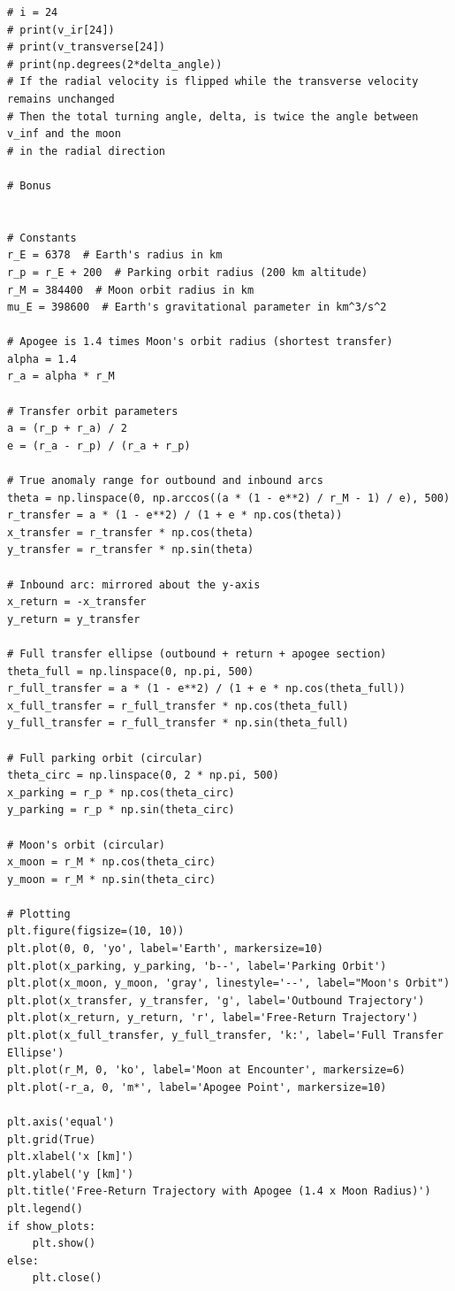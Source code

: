 \documentclass[12pt,twocolumn]{article}  %
\begin{document}
\begin{verbatim}
# i = 24
# print(v_ir[24])
# print(v_transverse[24])
# print(np.degrees(2*delta_angle))
# If the radial velocity is flipped while the transverse velocity remains unchanged
# Then the total turning angle, delta, is twice the angle between v_inf and the moon
# in the radial direction

# Bonus


# Constants
r_E = 6378  # Earth's radius in km
r_p = r_E + 200  # Parking orbit radius (200 km altitude)
r_M = 384400  # Moon orbit radius in km
mu_E = 398600  # Earth's gravitational parameter in km^3/s^2

# Apogee is 1.4 times Moon's orbit radius (shortest transfer)
alpha = 1.4
r_a = alpha * r_M

# Transfer orbit parameters
a = (r_p + r_a) / 2
e = (r_a - r_p) / (r_a + r_p)

# True anomaly range for outbound and inbound arcs
theta = np.linspace(0, np.arccos((a * (1 - e**2) / r_M - 1) / e), 500)
r_transfer = a * (1 - e**2) / (1 + e * np.cos(theta))
x_transfer = r_transfer * np.cos(theta)
y_transfer = r_transfer * np.sin(theta)

# Inbound arc: mirrored about the y-axis
x_return = -x_transfer
y_return = y_transfer

# Full transfer ellipse (outbound + return + apogee section)
theta_full = np.linspace(0, np.pi, 500)
r_full_transfer = a * (1 - e**2) / (1 + e * np.cos(theta_full))
x_full_transfer = r_full_transfer * np.cos(theta_full)
y_full_transfer = r_full_transfer * np.sin(theta_full)

# Full parking orbit (circular)
theta_circ = np.linspace(0, 2 * np.pi, 500)
x_parking = r_p * np.cos(theta_circ)
y_parking = r_p * np.sin(theta_circ)

# Moon's orbit (circular)
x_moon = r_M * np.cos(theta_circ)
y_moon = r_M * np.sin(theta_circ)

# Plotting
plt.figure(figsize=(10, 10))
plt.plot(0, 0, 'yo', label='Earth', markersize=10)
plt.plot(x_parking, y_parking, 'b--', label='Parking Orbit')
plt.plot(x_moon, y_moon, 'gray', linestyle='--', label="Moon's Orbit")
plt.plot(x_transfer, y_transfer, 'g', label='Outbound Trajectory')
plt.plot(x_return, y_return, 'r', label='Free-Return Trajectory')
plt.plot(x_full_transfer, y_full_transfer, 'k:', label='Full Transfer Ellipse')
plt.plot(r_M, 0, 'ko', label='Moon at Encounter', markersize=6)
plt.plot(-r_a, 0, 'm*', label='Apogee Point', markersize=10)

plt.axis('equal')
plt.grid(True)
plt.xlabel('x [km]')
plt.ylabel('y [km]')
plt.title('Free-Return Trajectory with Apogee (1.4 x Moon Radius)')
plt.legend()
if show_plots:
    plt.show()
else:
    plt.close()
    
    
    
\end{verbatim}
\end{document}
